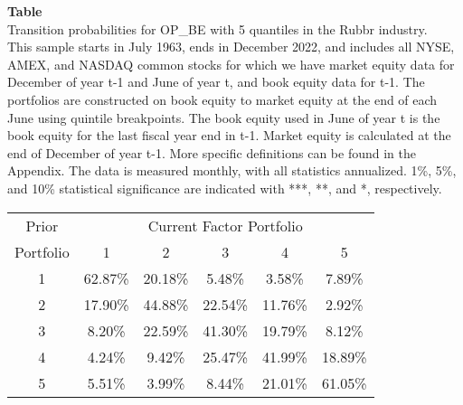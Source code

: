 \begin{table*}[ht!]
\raggedright
{}
\label{tab: transition_probs_OP_BE_Rubbr_with_5_quantiles}
\textbf{Table \thetable} \\
Transition probabilities for OP_BE with 5 quantiles in the Rubbr industry. \\
\hspace*{1em}This sample starts in July 1963, ends in December 2022, and includes all NYSE, AMEX, and NASDAQ common stocks for which we have market equity data for December of year t-1 and June of year t, and book equity data for t-1. The portfolios are constructed on book equity to market equity at the end of each June using quintile breakpoints.  The book equity used in June of year t is the book equity for the last fiscal year end in t-1.  Market equity is calculated at the end of December of year t-1.  More specific definitions can be found in the Appendix.  The data is measured monthly, with all statistics annualized.  1\%, 5\%, and 10\% statistical significance are indicated with ***, **, and *, respectively. \\
\vspace{0.5em}
\centering
\begin{adjustbox}{max width=\textwidth}
\begin{tabular}{@{}cccccc@{}}
\toprule
Prior & \multicolumn{5}{c}{Current Factor Portfolio} \\
Portfolio & 1 & 2 & 3 & 4 & 5 \\
\midrule
1 & 62.87\% & 20.18\% & 5.48\% & 3.58\% & 7.89\% \\
2 & 17.90\% & 44.88\% & 22.54\% & 11.76\% & 2.92\% \\
3 & 8.20\% & 22.59\% & 41.30\% & 19.79\% & 8.12\% \\
4 & 4.24\% & 9.42\% & 25.47\% & 41.99\% & 18.89\% \\
5 & 5.51\% & 3.99\% & 8.44\% & 21.01\% & 61.05\% \\
\bottomrule
\end{tabular}
\end{adjustbox}
\end{table*}